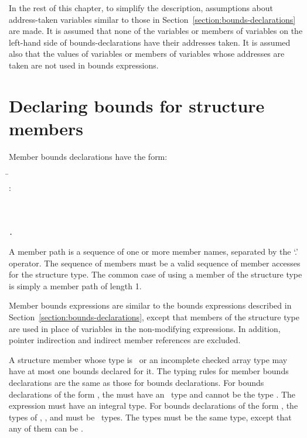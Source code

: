 In the rest of this chapter, to simplify the description, assumptions
about address-taken variables similar to those in
Section~\ref{section:bounds-declarations} are made.
It is assumed that none of the variables or members of variables on the
left-hand side of bounds-declarations have their addresses taken. It is
assumed also that the values of variables or members of variables whose
addresses are taken are not used in bounds expressions.

\section{Declaring bounds for structure members}

Member bounds declarations have the form:
\begin{tabbing}
\=\\
\>  :  \\
\\
\\
\>  \\
\>  \texttt{.} 
\end{tabbing}

A member path is a sequence of one or more member names, separated by
the `.' operator. The sequence of members must be a valid sequence of
member accesses for the structure type. The common case of using a
member of the structure type is simply a member path of length 1.

Member bounds expressions are similar to the bounds expressions
described in Section~\ref{section:bounds-declarations}, 
except that members of the structure type are
used in place of variables in the non-modifying expressions. In
addition, pointer indirection and indirect member references are
excluded.

A structure member whose type is \arrayptr\ or an incomplete
checked array type may have at most one bounds declared for it. The
typing rules for member bounds declarations are the same as those for
bounds declarations. For bounds declarations of the form
, the
 must have an \arrayptr\ type and cannot be the type
\arrayptrvoid. The expression
 must have an integral type. For bounds declarations of the
form , 
the types of , , and 
must be \arrayptr\ types. The types must be the same type,
except that any of them can be
\arrayptrvoid.

